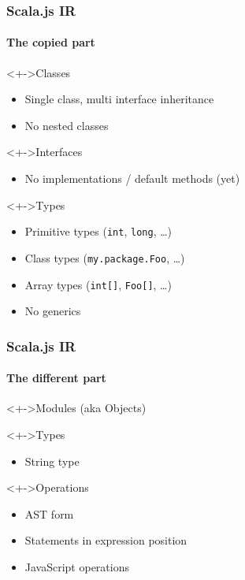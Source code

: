 \documentclass{beamer}
\begin{document}
\begin{frame}
  \frametitle{Scala.js IR}
  \framesubtitle{The copied part}

  \begin{block}<+->{Classes}
    \begin{itemize}
    \item Single class, multi interface inheritance
    \item No nested classes
    \end{itemize}
  \end{block}

  \begin{block}<+->{Interfaces}
    \begin{itemize}
    \item No implementations / default methods (yet)
    \end{itemize}
  \end{block}

  \begin{block}<+->{Types}
    \begin{itemize}
    \item Primitive types (\texttt{int}, \texttt{long}, \ldots)
    \item Class types (\texttt{my.package.Foo}, \ldots)
    \item Array types (\texttt{int[]}, \texttt{Foo[]}, \ldots)
    \item No generics
    \end{itemize}
  \end{block}
\end{frame}

\begin{frame}
  \frametitle{Scala.js IR}
  \framesubtitle{The different part}

  \begin{block}<+->{Modules (aka Objects)}
  \end{block}

  \begin{block}<+->{Types}
    \begin{itemize}
    \item String type
    \end{itemize}
  \end{block}

  \begin{block}<+->{Operations}
    \begin{itemize}
    \item AST form
    \item Statements in expression position
    \item JavaScript operations
    \end{itemize}
  \end{block}
\end{frame}
\end{document}
